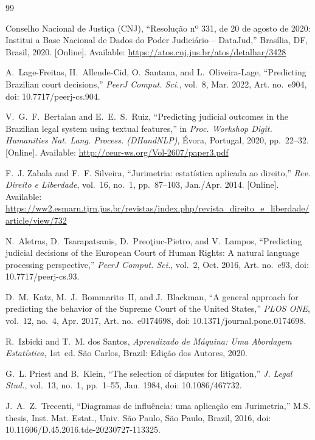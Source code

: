 \documentclass[conference]{IEEEtran}
\begin{document}
\begin{thebibliography}{99}

Conselho Nacional de Justiça (CNJ), ``Resolução nº 331, de 20 de agosto de 2020: Institui a Base Nacional de Dados do Poder Judiciário -- DataJud,'' Brasília, DF, Brasil, 2020. [Online]. Available: \url{https://atos.cnj.jus.br/atos/detalhar/3428}

A.~Lage-Freitas, H.~Allende-Cid, O.~Santana, and L.~Oliveira-Lage, ``Predicting Brazilian court decisions,'' \emph{PeerJ Comput. Sci.}, vol.~8, Mar. 2022, Art. no.~e904, doi: 10.7717/peerj-cs.904.

V.~G.~F.~Bertalan and E.~E.~S.~Ruiz, ``Predicting judicial outcomes in the Brazilian legal system using textual features,'' in \emph{Proc. Workshop Digit. Humanities Nat. Lang. Process. (DHandNLP)}, Évora, Portugal, 2020, pp.~22--32. [Online]. Available: \url{http://ceur-ws.org/Vol-2607/paper3.pdf}

F.~J. Zabala and F.~F. Silveira, ``Jurimetria: estatística aplicada ao direito,'' \emph{Rev. Direito e Liberdade}, vol.~16, no.~1, pp.~87--103, Jan./Apr. 2014. [Online]. Available: \url{https://ww2.esmarn.tjrn.jus.br/revistas/index.php/revista_direito_e_liberdade/article/view/732}

N.~Aletras, D.~Tsarapatsanis, D.~Preo{\c{t}}iuc-Pietro, and V.~Lampos, ``Predicting judicial decisions of the European Court of Human Rights: A natural language processing perspective,'' \emph{PeerJ Comput. Sci.}, vol.~2, Oct. 2016, Art. no.~e93, doi: 10.7717/peerj-cs.93.

D.~M.~Katz, M.~J.~Bommarito~II, and J.~Blackman, ``A general approach for predicting the behavior of the Supreme Court of the United States,'' \emph{PLOS ONE}, vol.~12, no.~4, Apr. 2017, Art. no.~e0174698, doi: 10.1371/journal.pone.0174698.

R.~Izbicki and T.~M. dos Santos, \emph{Aprendizado de Máquina: Uma Abordagem Estatística}, 1st~ed. São Carlos, Brazil: Edição dos Autores, 2020.

G.~L. Priest and B.~Klein, ``The selection of disputes for litigation,'' \emph{J. Legal Stud.}, vol.~13, no.~1, pp.~1--55, Jan. 1984, doi: 10.1086/467732.

J.~A.~Z.~Trecenti, ``Diagramas de influência: uma aplicação em Jurimetria,'' M.S. thesis, Inst. Mat. Estat., Univ. São Paulo, São Paulo, Brazil, 2016, doi: 10.11606/D.45.2016.tde-20230727-113325.


\end{thebibliography}
\end{document}
